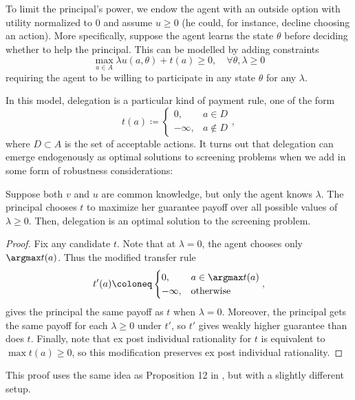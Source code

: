To limit the principal's power, we endow the agent with an outside option with utility normalized to \(0\) and assume \(u \geq 0\) (he could, for instance, decline choosing an action).
More specifically, suppose the agent learns the state \(\theta\) before deciding whether to help the principal.
This can be modelled by adding  constraints
\[
  \max_{a \in A} \lambda u(a, \theta) + t(a) \geq 0, \quad \forall \theta, \lambda \geq 0
\]
requiring the agent to be willing to participate in any state \(\theta\) for any \(\lambda\).


In this model, delegation is a particular kind of payment rule, one of the form
\[
   t(a) \coloneq \begin{cases}
     0, & a \in D \\
     -\infty, & a \notin D
   \end{cases},
\]
where \(D \subset A\) is the set of acceptable actions.
It turns out that delegation can emerge endogenously as optimal solutions to screening problems when we add in some form of robustness considerations:

\begin{proposition}
  Suppose both \(v\) and \(u\) are common knowledge, but only the agent knows \(\lambda\).
  The principal chooses \(t\) to maximize her guarantee payoff over all possible values of \(\lambda \geq 0\).
  Then, delegation is an optimal solution to the screening problem.
\end{proposition}
\begin{proof}
  Fix any candidate \(t\).
  Note that at \(\lambda = 0\), the agent chooses only \(\argmax t(a)\).
  Thus the modified transfer rule
  \[
    t'(a)
    \coloneq \begin{cases}
      0, & a \in \argmax t(a) \\
      -\infty, & \text{otherwise}
    \end{cases},
  \]
  gives the principal the same payoff as \(t\) when \(\lambda = 0\).
  Moreover, the principal gets the same payoff for each \(\lambda \geq 0\) under \(t'\), so \(t'\) gives weakly higher guarantee than does \(t\).
  Finally, note that ex post individual rationality for \(t\) is equivalent to \(\max t(a) \geq 0\), so this modification preserves ex post individual rationality.
\end{proof}

This proof uses the same idea as Proposition 12 in \textcite{alonso2026robust}, but with a slightly different setup.







